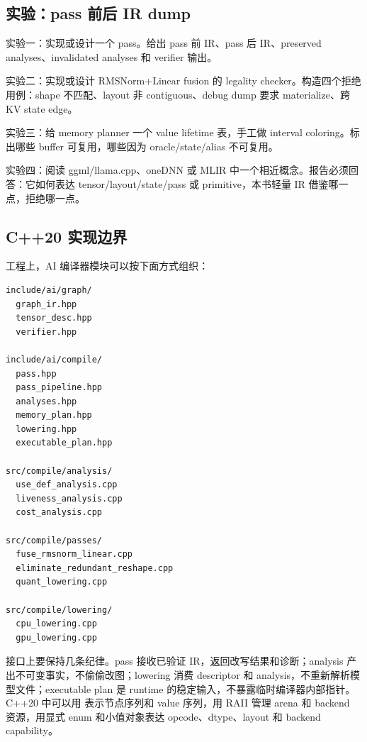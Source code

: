 \subsection{实验：pass 前后 IR dump}

\begin{exercisebox}
实验一：实现或设计一个  pass。给出 pass 前 IR、pass 后 IR、preserved analyses、invalidated analyses 和 verifier 输出。

实验二：实现或设计 RMSNorm+Linear fusion 的 legality checker。构造四个拒绝用例：shape 不匹配、layout 非 contiguous、debug dump 要求 materialize、跨 KV state edge。

实验三：给 memory planner 一个 value lifetime 表，手工做 interval coloring。标出哪些 buffer 可复用，哪些因为 oracle/state/alias 不可复用。

实验四：阅读 ggml/llama.cpp、oneDNN 或 MLIR 中一个相近概念。报告必须回答：它如何表达 tensor/layout/state/pass 或 primitive，本书轻量 IR 借鉴哪一点，拒绝哪一点。
\end{exercisebox}

\subsection{C++20 实现边界}

工程上，AI 编译器模块可以按下面方式组织：

\begin{lstlisting}[numbers=none,caption={AI 编译器模块组织建议}]
include/ai/graph/
  graph_ir.hpp
  tensor_desc.hpp
  verifier.hpp

include/ai/compile/
  pass.hpp
  pass_pipeline.hpp
  analyses.hpp
  memory_plan.hpp
  lowering.hpp
  executable_plan.hpp

src/compile/analysis/
  use_def_analysis.cpp
  liveness_analysis.cpp
  cost_analysis.cpp

src/compile/passes/
  fuse_rmsnorm_linear.cpp
  eliminate_redundant_reshape.cpp
  quant_lowering.cpp

src/compile/lowering/
  cpu_lowering.cpp
  gpu_lowering.cpp
\end{lstlisting}

接口上要保持几条纪律。pass 接收已验证 IR，返回改写结果和诊断；analysis 产出不可变事实，不偷偷改图；lowering 消费 descriptor 和 analysis，不重新解析模型文件；executable plan 是 runtime 的稳定输入，不暴露临时编译器内部指针。C++20 中可以用  表示节点序列和 value 序列，用 RAII 管理 arena 和 backend 资源，用显式 enum 和小值对象表达 opcode、dtype、layout 和 backend capability。

